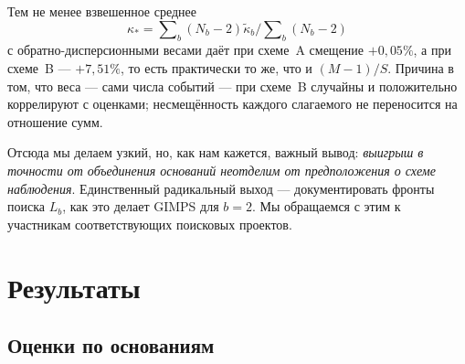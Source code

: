\documentclass[11pt,a4paper]{article}
\theoremstyle{plain}
\theoremstyle{remark}
\begin{document}
Тем не менее взвешенное среднее
$$\kappa_\ast=\sum\nolimits_b(N_b-2)\tilde\kappa_b\Big/\sum\nolimits_b(N_b-2)$$
с обратно-дисперсионными весами даёт при схеме~A смещение $+0{,}05\%$,
а при схеме~B --- $+7{,}51\%$, то есть практически то же, что и $(M-1)/S$. Причина в том, что веса --- сами числа событий ---
при схеме~B случайны и положительно коррелируют с оценками; несмещённость каждого
слагаемого не переносится на отношение сумм.

Отсюда мы делаем узкий, но, как нам кажется, важный вывод: \emph{выигрыш в точности от
объединения оснований неотделим от предположения о схеме наблюдения}.
Единственный радикальный выход --- документировать фронты поиска $L_b$, как это делает
GIMPS для $b=2$. Мы обращаемся с этим к участникам соответствующих поисковых проектов.

\section{Результаты}\label{sec:results}

\subsection{Оценки по основаниям}
\end{document}
